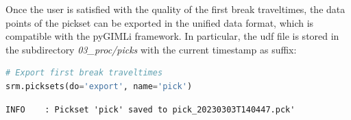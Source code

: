 \documentclass[a4paper,fleqn]{cas-sc}
\begin{document}
Once the user is satisfied with the quality of the first break traveltimes, the data points of the pickset can be exported in the unified data format, which is compatible with the pyGIMLi framework. In particular, the udf file is stored in the subdirectory \textit{03\_proc/picks} with the current timestamp as suffix:
\begin{lstlisting}[language=Python, firstnumber=22]
# Export first break traveltimes
srm.picksets(do='export', name='pick')
\end{lstlisting}
\begin{footnotesize}
\begin{verbatim}
INFO    : Pickset 'pick' saved to pick_20230303T140447.pck'
\end{verbatim}
\end{footnotesize}
\end{document}
